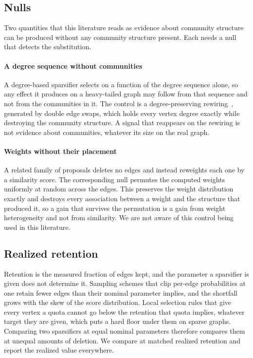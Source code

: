 \subsection{Nulls}\label{sec:protocol:nulls}

Two quantities that this literature reads as evidence about community structure
can be produced without any community structure present. Each needs a null that
detects the substitution.

\paragraph{A degree sequence without communities}
A degree-based sparsifier selects on a function of the degree sequence alone, so
any effect it produces on a heavy-tailed graph may follow from that sequence and
not from the communities in it. The control is a degree-preserving
rewiring~\cite{molloy1995critical}, generated by double edge swaps, which holds
every vertex degree exactly while destroying the community structure. A signal
that reappears on the rewiring is not evidence about communities, whatever its
size on the real graph.

\paragraph{Weights without their placement}
A related family of proposals deletes no edges and instead reweights each one by a
similarity score. The corresponding null permutes the computed weights uniformly
at random across the edges. This preserves the weight distribution exactly and
destroys every association between a weight and the structure that produced it,
so a gain that survives the permutation is a gain from weight heterogeneity and
not from similarity. We are not aware of this control being used in this
literature.

\subsection{Realized retention}\label{sec:protocol:retention}

Retention is the measured fraction of edges kept, and the parameter a sparsifier
is given does not determine it. Sampling schemes that clip per-edge probabilities
at one retain fewer edges than their nominal parameter implies, and the shortfall
grows with the skew of the score distribution. Local selection rules that give
every vertex a quota cannot go below the retention that quota implies, whatever
target they are given, which puts a hard floor under them on sparse graphs.
Comparing two sparsifiers at equal nominal parameters therefore compares them at
unequal amounts of deletion. We compare at matched realized retention and report
the realized value everywhere.

